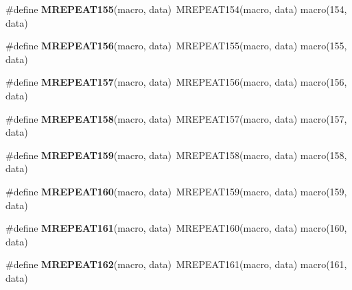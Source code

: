 \begin{DoxyCompactItemize}
\item 
\hypertarget{group__group__xmega__utils__mrepeat_gab9b1a8f988e6f8230241c06b25c09851}{\#define {\bfseries M\-R\-E\-P\-E\-A\-T155}(macro, data)~M\-R\-E\-P\-E\-A\-T154(macro, data)   macro(154, data)}\label{group__group__xmega__utils__mrepeat_gab9b1a8f988e6f8230241c06b25c09851}

\item 
\hypertarget{group__group__xmega__utils__mrepeat_ga4608d896f8fb7879075ba32ad5b687f9}{\#define {\bfseries M\-R\-E\-P\-E\-A\-T156}(macro, data)~M\-R\-E\-P\-E\-A\-T155(macro, data)   macro(155, data)}\label{group__group__xmega__utils__mrepeat_ga4608d896f8fb7879075ba32ad5b687f9}

\item 
\hypertarget{group__group__xmega__utils__mrepeat_gac6c7099162fd3b9ad60c2e4ff69b6bf1}{\#define {\bfseries M\-R\-E\-P\-E\-A\-T157}(macro, data)~M\-R\-E\-P\-E\-A\-T156(macro, data)   macro(156, data)}\label{group__group__xmega__utils__mrepeat_gac6c7099162fd3b9ad60c2e4ff69b6bf1}

\item 
\hypertarget{group__group__xmega__utils__mrepeat_ga76360eeb95fe2f07db4e54f3b56c3fef}{\#define {\bfseries M\-R\-E\-P\-E\-A\-T158}(macro, data)~M\-R\-E\-P\-E\-A\-T157(macro, data)   macro(157, data)}\label{group__group__xmega__utils__mrepeat_ga76360eeb95fe2f07db4e54f3b56c3fef}

\item 
\hypertarget{group__group__xmega__utils__mrepeat_ga0ffc3b60afa702e0588da2e00ddb9e7e}{\#define {\bfseries M\-R\-E\-P\-E\-A\-T159}(macro, data)~M\-R\-E\-P\-E\-A\-T158(macro, data)   macro(158, data)}\label{group__group__xmega__utils__mrepeat_ga0ffc3b60afa702e0588da2e00ddb9e7e}

\item 
\hypertarget{group__group__xmega__utils__mrepeat_gad1af2da931db2624f37a6357de14bc12}{\#define {\bfseries M\-R\-E\-P\-E\-A\-T160}(macro, data)~M\-R\-E\-P\-E\-A\-T159(macro, data)   macro(159, data)}\label{group__group__xmega__utils__mrepeat_gad1af2da931db2624f37a6357de14bc12}

\item 
\hypertarget{group__group__xmega__utils__mrepeat_ga8c32111637f7d8420f239a6de681667c}{\#define {\bfseries M\-R\-E\-P\-E\-A\-T161}(macro, data)~M\-R\-E\-P\-E\-A\-T160(macro, data)   macro(160, data)}\label{group__group__xmega__utils__mrepeat_ga8c32111637f7d8420f239a6de681667c}

\item 
\hypertarget{group__group__xmega__utils__mrepeat_ga24cbd158a09a6694b3578c3332dbe324}{\#define {\bfseries M\-R\-E\-P\-E\-A\-T162}(macro, data)~M\-R\-E\-P\-E\-A\-T161(macro, data)   macro(161, data)}\label{group__group__xmega__utils__mrepeat_ga24cbd158a09a6694b3578c3332dbe324}


\end{DoxyCompactItemize}
